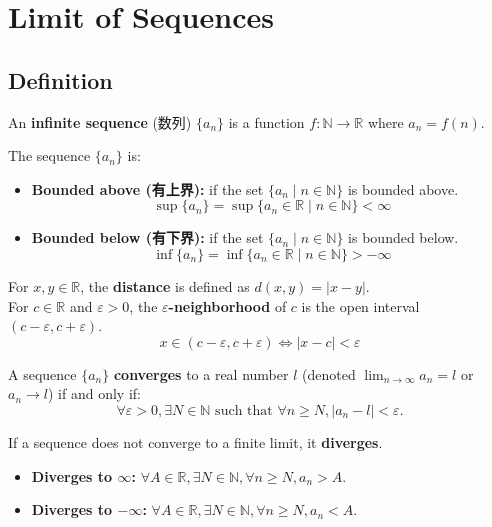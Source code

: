 \documentclass[
	UTF-8,
	11pt, %
	a4paper, %
]{LegrandOrangeBook}
\begin{document}
    \section{Limit of Sequences}

    \subsection{Definition}

    \begin{definition}
    An \textbf{infinite sequence} (数列) $\{a_n\}$ is a function $f: \mathbb{N} \to \mathbb{R}$ where $a_n = f(n)$.

    The sequence $\{a_n\}$ is:
    \begin{itemize}
        \item \textbf{Bounded above (有上界):} if the set $\{a_n \mid n \in \mathbb{N}\}$ is bounded above.
        \[ \sup \{a_n\} = \sup \{ a_n \in \mathbb{R} \mid n \in \mathbb{N} \} < \infty \]
        \item \textbf{Bounded below (有下界):} if the set $\{a_n \mid n \in \mathbb{N}\}$ is bounded below.
        \[ \inf \{a_n\} = \inf \{ a_n \in \mathbb{R} \mid n \in \mathbb{N} \} > -\infty \]
    \end{itemize}
    \end{definition}

    \begin{definition}
    For $x, y \in \mathbb{R}$, the \textbf{distance} is defined as $d(x,y) = |x - y|$. \\
    For $c \in \mathbb{R}$ and $\varepsilon > 0$, the \textbf{$\varepsilon$-neighborhood} of $c$ is the open interval $(c-\varepsilon, c+\varepsilon)$.
    \[ x \in (c-\varepsilon, c+\varepsilon) \iff |x - c| < \varepsilon \]
    \end{definition}

    \begin{definition}[Convergence / 收敛]
    A sequence $\{a_n\}$ \textbf{converges} to a real number $l$ (denoted $\lim_{n \to \infty} a_n = l$ or $a_n \to l$) if and only if:
    \[ \forall \varepsilon > 0, \exists N \in \mathbb{N} \text{ such that } \forall n \ge N, |a_n - l| < \varepsilon. \]
    \end{definition}



    \begin{definition}[Divergence / 发散]
    If a sequence does not converge to a finite limit, it \textbf{diverges}.
    \begin{itemize}
        \item \textbf{Diverges to $\infty$:} $\forall A \in \mathbb{R}, \exists N \in \mathbb{N}, \forall n \ge N, a_n > A$.
        \item \textbf{Diverges to $-\infty$:} $\forall A \in \mathbb{R}, \exists N \in \mathbb{N}, \forall n \ge N, a_n < A$.
    \end{itemize}
    \end{definition}
\end{document}
